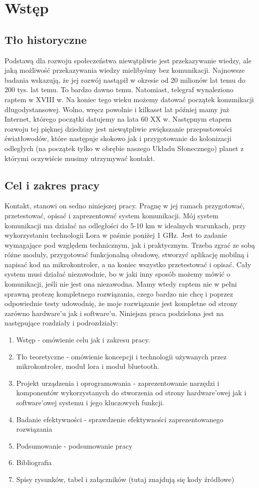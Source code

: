 \chapter{Wstęp}
\section{Tło historyczne}
Podstawą dla rozwoju społeczeństwa niewątpliwie jest przekazywanie wiedzy, ale jaką możliwość przekazywania wiedzy mielibyśmy bez komunikacji.
Najnowsze badania\cite{doi:10.1126/sciadv.aaw3916} wskazują, że jej rozwój nastąpił w okresie od 20 milionów lat temu do 200 tys. lat temu. To bardzo dawno temu. Natomiast, telegraf\cite{wiki:telegraf} wynaleziono raptem w XVIII w. Na koniec tego wieku możemy datować początek komunikacji długodystansowej. Wolno, wręcz powolnie i kilkaset lat później mamy już Internet\cite{wiki:internet}, którego początki datujemy na lata 60 XX w. Następnym etapem rozwoju tej pięknej dziedziny jest niewątpliwie zwiększanie przepustowości światłowodów, które następuje skokowo jak i przygotowanie do kolonizacji odległych (na początek tylko w obrębie naszego Układu Słonecznego) planet z którymi oczywiście musimy utrzymywać kontakt.
\section{Cel i zakres pracy}
Kontakt, stanowi on sedno niniejszej pracy. Pragnę w jej ramach przygotować, przetestować, opisać i zaprezentować system komunikacji.
Mój system komunikacji ma działać na odległości do 5-10 km w idealnych warunkach, przy wykorzystaniu technologii Lora\cite{enwiki:lora} w paśmie poniżej 1 GHz.
Jest to zadanie wymagające pod względem technicznym, jak i praktycznym. Trzeba zgrać ze sobą różne moduły, przygotować funkcjonalną obudowę, stworzyć aplikację mobilną i napisać kod na mikrokontroler, a na koniec wszystko przetestować i opisać. Cały system musi działać niezawodnie, bo w jaki inny sposób możemy mówić o komunikacji, jeśli nie jest ona niezawodna. Mamy wtedy raptem nie w pełni sprawną protezę kompletnego rozwiązania, czego bardzo nie chcę i poprzez odpowiednie testy udowodnię, że moje rozwiązanie jest kompletne od strony zarówno hardware'u jak i software'u.
Niniejsza praca podzielona jest na następujące rozdziały i podrozdziały:
\begin{enumerate}
	\item Wstęp - omówienie celu jak i zakresu pracy.
	\item Tło teoretyczne - omówienie koncepcji i technologii używanych przez mikrokontroler, moduł lora i moduł bluetooth.
	\item Projekt urządzenia i oprogramowania - zaprezentowanie narzędzi i komponentów wykorzystanych do stworzenia od strony hardware'owej jak i software'owej systemu i jego kluczowych funkcji.
	\item Badanie efektywności - sprawdzenie efektywności zaprezentowanego rozwiązania
	\item Podsumowanie - podsumowanie pracy
	\item Bibliografia
	\item Spisy rysunków, tabel i załączników (tutaj znajdują się kody źródłowe)
\end{enumerate}